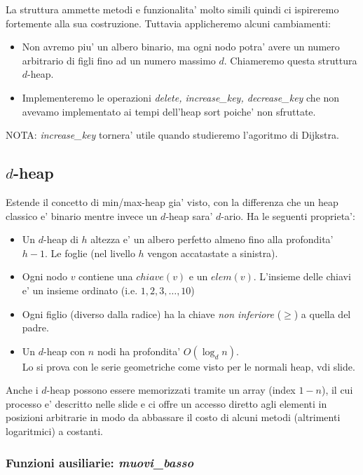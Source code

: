 \documentclass{article}
\begin{document}
La struttura ammette metodi e funzionalita' molto simili quindi ci ispireremo
fortemente alla sua costruzione. Tuttavia applicheremo alcuni cambiamenti:
\begin{itemize}
  \item Non avremo piu' un albero binario, ma ogni nodo potra' avere un numero
    arbitrario di figli fino ad un numero massimo $d$. Chiameremo questa
    struttura $d$-heap.
  \item Implementeremo le operazioni \emph{delete, increase\_key, decrease\_key}
    che non avevamo implementato ai tempi dell'heap sort poiche' non sfruttate.
\end{itemize}

NOTA: \emph{increase\_key} tornera' utile quando studieremo l'agoritmo di Dijkstra.

\subsection{$d$-heap}

Estende il concetto di min/max-heap gia' visto, con la differenza che un heap
classico e' binario mentre invece un $d$-heap sara' $d$-ario.
Ha le seguenti proprieta':
\begin{itemize}
  \item Un $d$-heap di $h$ altezza e' un albero perfetto almeno fino alla
    profondita' $h-1$. Le foglie (nel livello $h$ vengon accatastate a sinistra).
  \item Ogni nodo $v$ contiene una $chiave(v)$ e un $elem(v)$. L'insieme delle
    chiavi e' un insieme ordinato (i.e. $1,2,3,\ldots,10$)
  \item Ogni figlio (diverso dalla radice) ha la chiave \emph{non inferiore}
    ($\geq$) a quella del padre.
  \item Un $d$-heap con $n$ nodi ha profondita' $O(\log_d n)$. \\
    Lo si prova con le serie geometriche come visto per le normali heap, vdi slide.
\end{itemize}

Anche i $d$-heap possono essere memorizzati tramite un array (index $1-n$), il
cui processo e' descritto nelle slide e ci offre un accesso diretto agli
elementi in posizioni arbitrarie in modo da abbassare il costo di alcuni metodi
(altrimenti logaritmici) a costanti.

\subsubsection{Funzioni ausiliarie: \emph{muovi}\_\emph{basso} }
\end{document}
